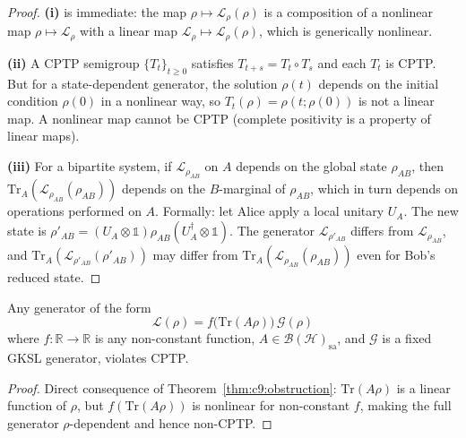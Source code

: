 \begin{proof}
\textbf{(i)} is immediate: the map $\rho \mapsto \mathcal{L}_\rho(\rho)$
is a composition of a nonlinear map $\rho \mapsto \mathcal{L}_\rho$ with
a linear map $\mathcal{L}_\rho \mapsto \mathcal{L}_\rho(\rho)$, which
is generically nonlinear.

\textbf{(ii)} A CPTP semigroup $\{T_t\}_{t\geq 0}$ satisfies
$T_{t+s} = T_t \circ T_s$ and each $T_t$ is CPTP.  But for a
state-dependent generator, the solution $\rho(t)$ depends on the initial
condition $\rho(0)$ in a nonlinear way, so $T_t(\rho) = \rho(t;\rho(0))$
is not a linear map.  A nonlinear map cannot be CPTP (complete positivity
is a property of linear maps).

\textbf{(iii)} For a bipartite system, if $\mathcal{L}_{\rho_{AB}}$ on
$A$ depends on the global state $\rho_{AB}$, then
$\mathrm{Tr}_A(\mathcal{L}_{\rho_{AB}}(\rho_{AB}))$ depends on the
$B$-marginal of $\rho_{AB}$, which in turn depends on operations
performed on $A$.  Formally: let Alice apply a local unitary $U_A$.
The new state is $\rho'_{AB} = (U_A \otimes \mathbb{1})\rho_{AB}
(U_A^\dagger \otimes \mathbb{1})$.  The generator $\mathcal{L}_{\rho'_{AB}}$
differs from $\mathcal{L}_{\rho_{AB}}$, and $\mathrm{Tr}_A(
\mathcal{L}_{\rho'_{AB}}(\rho'_{AB}))$ may differ from
$\mathrm{Tr}_A(\mathcal{L}_{\rho_{AB}}(\rho_{AB}))$ even for
Bob's reduced state.
\end{proof}

\begin{corollary}
\label{cor:c9:ev_generators}
Any generator of the form
\begin{equation}
  \mathcal{L}(\rho) = f\bigl(\mathrm{Tr}(A\rho)\bigr)\,
    \mathcal{G}(\rho)
  \label{eq:c9:ev_gen}
\end{equation}
where $f : \mathbb{R} \to \mathbb{R}$ is any non-constant function,
$A \in \mathcal{B}(\mathcal{H})_{\mathrm{sa}}$, and $\mathcal{G}$ is a
fixed GKSL generator, violates CPTP.
\end{corollary}

\begin{proof}
Direct consequence of Theorem~\ref{thm:c9:obstruction}:
$\mathrm{Tr}(A\rho)$ is a linear function of $\rho$, but
$f(\mathrm{Tr}(A\rho))$ is nonlinear for non-constant $f$, making
the full generator $\rho$-dependent and hence non-CPTP.
\end{proof}


